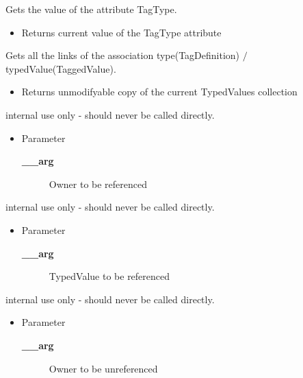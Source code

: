 \begin{desc}Gets the value of the attribute TagType.
\begin{itemize}
\item{Returns current value of the TagType attribute }
\end{itemize}
\end{desc}

\begin{desc}Gets all the links of the association type(TagDefinition)
 $/$ typedValue(TaggedValue).
\begin{itemize}
\item{Returns unmodifyable copy of the current TypedValues collection }
\end{itemize}
\end{desc}

\begin{desc}internal use only - should never be called directly.
\begin{itemize}
\item{Parameter
  \begin{description}
   \item[{\bf \_\_arg}]{Owner to be referenced}
  \end{description}}
\end{itemize}
\end{desc}

\begin{desc}internal use only - should never be called directly.
\begin{itemize}
\item{Parameter
  \begin{description}
   \item[{\bf \_\_arg}]{TypedValue to be referenced}
  \end{description}}
\end{itemize}
\end{desc}

\begin{desc}internal use only - should never be called directly.
\begin{itemize}
\item{Parameter
  \begin{description}
   \item[{\bf \_\_arg}]{Owner to be unreferenced}
  \end{description}}
\end{itemize}
\end{desc}

